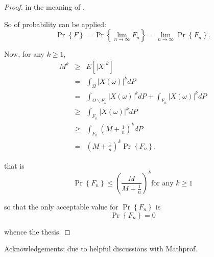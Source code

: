 \documentclass[12pt]{article}
\begin{document}
\begin{proof}
in the meaning of .

So  of probability can be applied:
\[
\Pr \left\{ F\right\} =\Pr \left\{ \lim_{n\rightarrow \infty }F_{n}\right\}
=\lim_{n\rightarrow \infty }\Pr \left\{ F_{n}\right\} .
\]

Now, for any $k\geq 1$,
\begin{eqnarray*}
M^{k} &\geq &E\left[ \left\vert X\right\vert ^{k}\right] \\
&=&\int_{\Omega }\left\vert X\left( \omega \right) \right\vert ^{k}dP \\
&=&\int_{\Omega \backslash F_{n}}\left\vert X\left( \omega \right)
\right\vert ^{k}dP+\int_{F_{n}}\left\vert X\left( \omega \right) \right\vert
^{k}dP \\
&\geq &\int_{F_{n}}\left\vert X\left( \omega \right) \right\vert ^{k}dP \\
&\geq &\int_{F_{n}}\left( M+\frac{1}{n}\right) ^{k}dP \\
&=&\left( M+\frac{1}{n}\right) ^{k}\Pr \left\{ F_{n}\right\} .
\end{eqnarray*}

that is%
\[
\Pr \left\{ F_{n}\right\} \leq\left( \frac{M}{M+\frac{1}{n}}\right) ^{k}\text{
\ for any }k\geq 1
\]

so that the only acceptable value for $\Pr \left\{ F_{n}\right\} $ is
\[
\Pr \left\{ F_{n}\right\} =0
\]

whence the thesis.
\end{proof}

Acknowledgements: due to helpful discussions with Mathprof.
\end{document}
